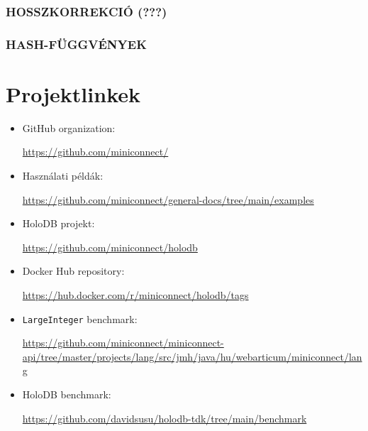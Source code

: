 \documentclass[
    parspace,
    noindent,
    nohyp,
]{elteiktdk}[2023/04/10]
\begin{document}

\subsection{HOSSZKORREKCIÓ (???)}

\subsection{HASH-FÜGGVÉNYEK}


\pagebreak

\appendix

{}
\printbibliography[title=\biblabel]
\cleardoublepage

{}
\listoffigures
\cleardoublepage

{}
\listoftables
\cleardoublepage

\chapter{Projektlinkek}

\begin{itemize}
    \item GitHub organization: \par \url{https://github.com/miniconnect/}
    \item Használati példák: \par \url{https://github.com/miniconnect/general-docs/tree/main/examples}
    \item HoloDB projekt: \par \url{https://github.com/miniconnect/holodb}
    \item Docker Hub repository: \par \url{https://hub.docker.com/r/miniconnect/holodb/tags}
    \item \texttt{LargeInteger} benchmark: \par \url{https://github.com/miniconnect/miniconnect-api/tree/master/projects/lang/src/jmh/java/hu/webarticum/miniconnect/lang}
    \item HoloDB benchmark: \par \url{https://github.com/davidsusu/holodb-tdk/tree/main/benchmark}
\end{itemize}
\end{document}
